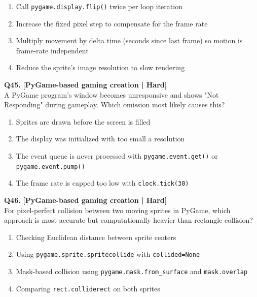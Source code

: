 \begin{enumerate}[label=(\alph*),topsep=2pt,itemsep=1pt,partopsep=0pt,parsep=0pt]
    \item \relax Call \texttt{pygame.display.flip()} twice per loop iteration
    \item \relax Increase the fixed pixel step to compensate for the frame rate
    \item \relax Multiply movement by delta time (seconds since last frame) so motion is frame-rate independent
    \item \relax Reduce the sprite's image resolution to slow rendering
\end{enumerate}
\vspace{2mm}

\noindent\textbf{Q45.} \hfill {\small\color{LPUOrange}\textbf{[PyGame-based gaming creation | Hard]}}\\[2pt]
A PyGame program's window becomes unresponsive and shows "Not Responding" during gameplay. Which omission most likely causes this?

\begin{enumerate}[label=(\alph*),topsep=2pt,itemsep=1pt,partopsep=0pt,parsep=0pt]
    \item \relax Sprites are drawn before the screen is filled
    \item \relax The display was initialized with too small a resolution
    \item \relax The event queue is never processed with \texttt{pygame.event.get()} or \texttt{pygame.event.pump()}
    \item \relax The frame rate is capped too low with \texttt{clock.tick(30)}
\end{enumerate}
\vspace{2mm}

\noindent\textbf{Q46.} \hfill {\small\color{LPUOrange}\textbf{[PyGame-based gaming creation | Hard]}}\\[2pt]
For pixel-perfect collision between two moving sprites in PyGame, which approach is most accurate but computationally heavier than rectangle collision?

\begin{enumerate}[label=(\alph*),topsep=2pt,itemsep=1pt,partopsep=0pt,parsep=0pt]
    \item \relax Checking Euclidean distance between sprite centers
    \item \relax Using \texttt{pygame.sprite.spritecollide} with \texttt{collided=None}
    \item \relax Mask-based collision using \texttt{pygame.mask.from\_surface} and \texttt{mask.overlap}
    \item \relax Comparing \texttt{rect.colliderect} on both sprites
\end{enumerate}
\vspace{2mm}

